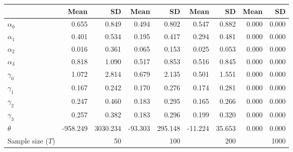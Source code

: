 
\begin{tabular}[t]{lrrrrrrrr}
\toprule
  & Mean & SD & Mean  & SD  & Mean   & SD   & Mean    & SD   \\
\midrule
$\alpha_{0}$ & 0.655 & 0.849 & 0.494 & 0.802 & 0.547 & 0.882 & 0.000 & 0.000\\
$\alpha_{1}$ & 0.401 & 0.534 & 0.195 & 0.417 & 0.294 & 0.481 & 0.000 & 0.000\\
$\alpha_{2}$ & 0.016 & 0.361 & 0.065 & 0.153 & 0.025 & 0.053 & 0.000 & 0.000\\
$\alpha_{3}$ & 0.818 & 1.090 & 0.517 & 0.853 & 0.516 & 0.845 & 0.000 & 0.000\\
$\gamma_{0}$ & 1.072 & 2.814 & 0.679 & 2.135 & 0.501 & 1.551 & 0.000 & 0.000\\
$\gamma_{1}$ & 0.167 & 0.242 & 0.170 & 0.276 & 0.174 & 0.281 & 0.000 & 0.000\\
$\gamma_{2}$ & 0.247 & 0.460 & 0.183 & 0.295 & 0.165 & 0.266 & 0.000 & 0.000\\
$\gamma_{3}$ & 0.257 & 0.382 & 0.183 & 0.296 & 0.199 & 0.320 & 0.000 & 0.000\\
$\theta$ & -958.249 & 3030.234 & -93.303 & 295.148 & -11.224 & 35.653 & 0.000 & 0.000\\
Sample size ($T$) &  & 50 &  & 100 &  & 200 &  & 1000\\
\bottomrule
\end{tabular}

